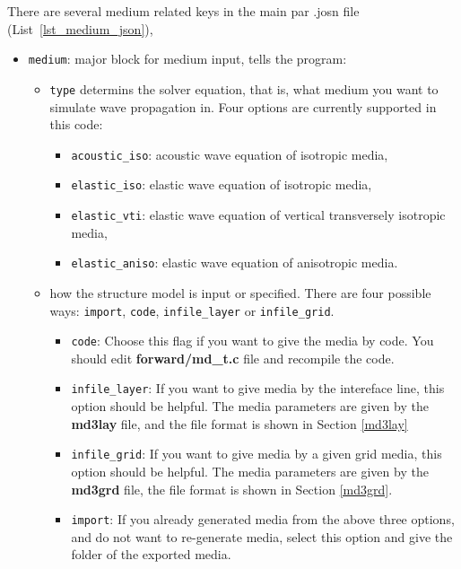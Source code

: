 There are several medium related keys in the main par .josn file (List~\ref{lst_medium_json}),
\begin{itemize}
\item \verb|medium|: major block for medium input, tells the program:
  \begin{itemize}

  \item \texttt{type} determins the solver equation, that is,
    what medium you want to simulate wave propagation in.
    Four options are currently supported in this code:
    \begin{itemize}
      \item \texttt{acoustic\_iso}: acoustic wave equation of isotropic media,
      \item \texttt{elastic\_iso}: elastic wave equation of isotropic media,
      \item \texttt{elastic\_vti}: elastic wave equation of vertical transversely isotropic media,
      \item \texttt{elastic\_aniso}: elastic wave equation of anisotropic media. 
    \end{itemize}

  \item how the structure model is input or specified.
    There are four possible ways:
    \texttt{import}, \texttt{code}, \texttt{infile\_layer} or \texttt{infile\_grid}.
    \begin{itemize}  
      \item \texttt{code}: Choose this flag if you want to give the media by code.
                 You should edit \textbf{forward/md\_t.c} file and recompile the code.
      \item \texttt{infile\_layer}: If you want to give media by the intereface line,
          this option should be helpful. The media parameters are given by the \textbf{md3lay} file,
          and the file format is shown in Section \ref{md3lay} 
      \item \texttt{infile\_grid}: If you want to give media by a given grid media,
          this option should be helpful. The media parameters are given by the \textbf{md3grd} file,
          the file format is shown in Section \ref{md3grd}.
      \item \texttt{import}: If you already generated media from the above three options,
        and do not want to re-generate media, 
        select this option and give the folder of the exported media. 
    \end{itemize}


\end{itemize}
\end{itemize}
